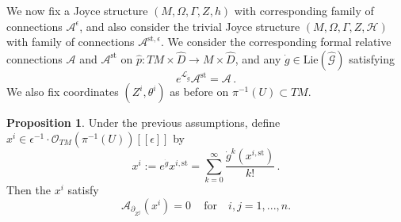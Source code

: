\documentclass{article}
\theoremstyle{definition}
\newtheorem{proposition}[theorem]{Proposition}
\numberwithin{equation}{section}
\begin{document}
We now fix a Joyce structure $(M,\Omega,\Gamma,Z,h)$ with corresponding family of connections $\mathcal{A}^{\epsilon}$, and also consider the trivial Joyce structure $(M,\Omega,\Gamma,Z,\mathcal{H})$ with family of connections $\mathcal{A}^{\text{st},\epsilon}$. We consider the corresponding formal relative connections $\mathcal{A}$ and $\mathcal{A}^{\text{st}}$ on $\hat{p}:TM\times \widehat{D}\to M\times \widehat{D}$, and any $\dot{g}\in \text{Lie}(\widehat{\mathcal{G}})$ satisfying 
\begin{equation*}
e^{\mathcal{L}_{\dot{g}}}\mathcal{A}^{\text{st}}=\mathcal{A}\,.
\end{equation*}
We also fix coordinates $(Z^i, \theta^i)$ as before on $\pi^{-1}(U)\subset TM$. 

\begin{proposition}\label{flatcoordsprop}
    Under the previous assumptions, define $x^i\in \epsilon^{-1}\cdot \mathcal{O}_{TM}(\pi^{-1}(U))[[\epsilon]]$ by 
    \begin{equation*}
        x^i:=e^{\dot{g}}x^{i,\text{st}}=\sum_{k=0}^{\infty}\frac{\dot{g}^k(x^{i,\text{st}})}{k!}\,.
    \end{equation*}
    Then the $x^i$ satisfy 
\begin{equation*}
    \mathcal{A}_{\partial_{Z^j}}(x^i)=0\, \quad \text{for} \quad  i,j=1,...,n.
\end{equation*}
\end{proposition}
\end{document}
